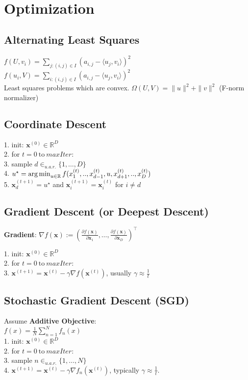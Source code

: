 \section{Optimization}

\subsection*{Alternating Least Squares}
$f(U,v_i)=\sum_{j:(i,j)\in I} (a_{i,j} - \langle u_j, v_i \rangle)^2$\\
$f(u_i,V)=\sum_{i:(i,j)\in I} (a_{i,j} - \langle u_j, v_i \rangle)^2$\\
Least squares problems which are convex.
$\Omega(U, V)=\|u\|^2+\|v\|^2$ (F-norm normalizer)

\subsection*{Coordinate Descent}
1. init: $\mathbf{x}^{(0)} \in \mathbb{R}^D$\\
2. for $t = 0 \ \text{to} \ \mathit{maxIter}$:\\
3. sample $d \in_{u.a.r.} \{1, \ldots, D\}$\\
4. $u^\star = \operatorname*{arg\,min}_{u \in \mathbb{R}} f(x_1^{(t)}, .., x_{d-1}^{(t)}, u, x_{d+1}^{(t)}, .., x_D^{(t)})$\\
5. $\mathbf{x}_d^{(t+1)} = u^\star$ and $\mathbf{x}_i^{(t+1)} = \mathbf{x}_i^{(t)}$ for $i \neq d$

\subsection*{Gradient Descent (or Deepest Descent)}
\textbf{Gradient}: $\nabla f(\mathbf{x}) := \left( \frac{\partial f(\mathbf{x})}{\partial \mathbf{x}_1}, \ldots, \frac{\partial f(\mathbf{x})}{\partial \mathbf{x}_D} \right)^\top$

1. init: $\mathbf{x}^{(0)} \in \mathbb{R}^D$\\
2. for $t = 0 \ \text{to} \ \mathit{maxIter}$:\\
3. $\mathbf{x}^{(t+1)} = \mathbf{x}^{(t)} - \gamma \nabla f(\mathbf{x}^{(t)})$, usually $\gamma \approx \frac{1}{t}$

\subsection*{Stochastic Gradient Descent (SGD)}
Assume \textbf{Additive Objective}:\\
$f(x) = \frac{1}{N}\sum_{n=1}^{N}f_n(x)$\\
1. init: $\mathbf{x}^{(0)} \in \mathbb{R}^D$\\
2. for $t = 0 \ \text{to} \ \mathit{maxIter}$:\\
3. sample $n \in_{u.a.r.} \{1, \ldots, N\}$\\
4. $\mathbf{x}^{(t+1)} = \mathbf{x}^{(t)} - \gamma \nabla f_n(\mathbf{x}^{(t)})$, typically  $\gamma \approx \frac{1}{t}$.

